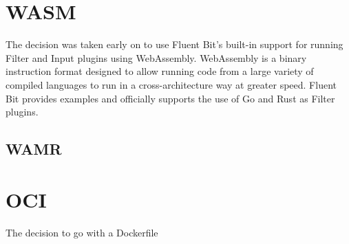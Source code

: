 \section{WASM}
The decision was taken early on to use Fluent Bit's built-in support for running Filter and Input plugins using WebAssembly. WebAssembly is a binary instruction format designed to allow running code from a large variety of compiled languages to run in a cross-architecture way at greater speed.\cite{Webassembly} Fluent Bit provides examples and officially supports the use of Go and Rust as Filter plugins.  

\subsection{WAMR}
\section{OCI}
The decision to go with a Dockerfile 